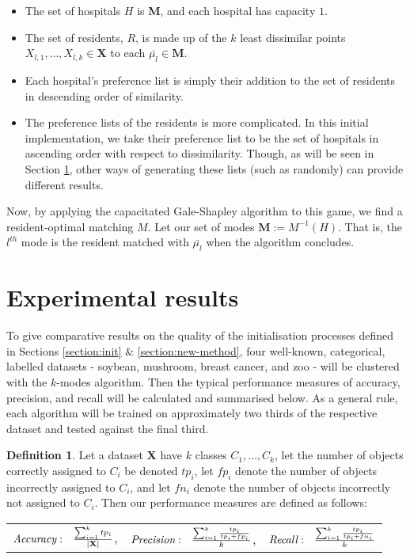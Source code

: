 \documentclass{article}
\theoremstyle{definition}
\newtheorem{definition}{Definition}[section]
\begin{document}
\begin{itemize}
	\item The set of hospitals $H$ is \textbf{M}, and each hospital has capacity $1$.

	\item The set of residents, $R$, is made up of the $k$ least dissimilar points $X_{l,1}, \ldots, X_{l,k} \in \textbf{X}$ to each $\bar{\mu_l} \in \textbf{M}$.

	\item Each hospital's preference list is simply their addition to the set of residents in descending order of similarity.
	
	\item The preference lists of the residents is more complicated. In this initial implementation, we take their preference list to be the set of hospitals in ascending order with respect to dissimilarity. Though, as will be seen in Section \ref{section:results}, other ways of generating these lists (such as randomly) can provide different results.
\end{itemize}

Now, by applying the capacitated Gale-Shapley algorithm to this game, we find a resident-optimal matching $M$. Let our set of modes $\textbf{M} := M^{-1}(H)$. That is, the $l^{th}$ mode is the resident matched with $\bar{\mu_l}$ when the algorithm concludes.



\section{Experimental results}\label{section:results}

To give comparative results on the quality of the initialisation processes defined in Sections \ref{section:init} \& \ref{section:new-method}, four well-known, categorical, labelled datasets - soybean, mushroom, breast cancer, and zoo - will be clustered with the $k$-modes algorithm. Then the typical performance measures of accuracy, precision, and recall will be calculated and summarised below. As a general rule, each algorithm will be trained on approximately two thirds of the respective dataset and tested against the final third.

\begin{definition}
	Let a dataset \textbf{X} have $k$ classes $C_1, \ldots, C_k$, let the number of objects correctly assigned to $C_i$ be denoted $tp_i$, let $fp_i$ denote the number of objects incorrectly assigned to $C_i$, and let $fn_i$ denote the number of objects incorrectly not assigned to $C_i$. Then our performance measures are defined as follows: \\
		
		\centering
		\begin{tabular}{ccc}
			$\emph{Accuracy}: \ \ \frac{\sum_{i=1}^{k}{tp_i}}{|\textbf{X}|}$, &
			
			$\emph{Precision}: \ \ \frac{\sum_{i=1}^{k} \frac{tp_i}{tp_i + fp_i}}{k}$, &
			
			$\emph{Recall}: \ \ \frac{\sum_{i=1}^{k} \frac{tp_i}{tp_i + fn_i}}{k}$ \\
		\end{tabular}
\end{definition}
\end{document}
